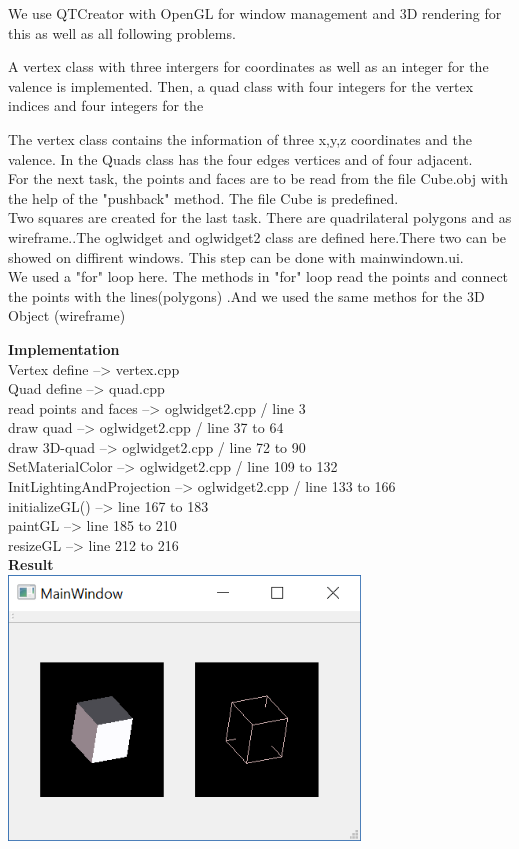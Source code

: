 \documentclass[12pt,a4paper]{scrartcl}
\begin{document}
We use QTCreator with OpenGL for window management and 3D rendering for this as well as all following problems.

A vertex class with three intergers for coordinates as well as an integer for the valence is implemented.
Then, a quad class with four integers for the vertex indices and four integers for the 

The vertex class contains the information of three x,y,z coordinates and the valence. In the Quads class has the four edges vertices and of four adjacent.\\
For the next task, the points and faces are to be read from the file Cube.obj with the help of the "pushback" method. The file Cube is predefined. \\
Two squares are created for the last task. There are quadrilateral polygons and as wireframe..The oglwidget and oglwidget2 class are defined here.There two can be showed on diffirent windows. This step can be done with mainwindown.ui.\\
We used a "for" loop here. The methods in "for" loop read the points and connect the points with the lines(polygons) .And we used the same methos for the 3D Object (wireframe)\\[0,5cm]

\newpage

\textbf{Implementation}\\


Vertex define --> vertex.cpp\\
Quad define --> quad.cpp\\
read points and faces --> oglwidget2.cpp / line 3\\
draw quad --> oglwidget2.cpp / line 37 to 64\\
draw 3D-quad --> oglwidget2.cpp / line 72 to 90\\
SetMaterialColor --> oglwidget2.cpp / line 109 to 132\\
InitLightingAndProjection --> oglwidget2.cpp / line 133 to 166\\
initializeGL() --> line 167 to 183\\
paintGL --> line 185 to 210\\
resizeGL --> line 212 to 216 \\[0,5cm]



\textbf{Result}\\

\includegraphics[width=0.7\textwidth]{Problem 1.png}\\
\end{document}
